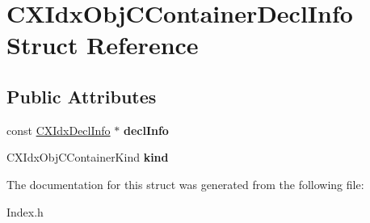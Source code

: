 \hypertarget{structCXIdxObjCContainerDeclInfo}{}\section{C\+X\+Idx\+Obj\+C\+Container\+Decl\+Info Struct Reference}
\label{structCXIdxObjCContainerDeclInfo}
\subsection*{Public Attributes}
\begin{DoxyCompactItemize}
\item 
\mbox{\label{structCXIdxObjCContainerDeclInfo_a39f1c681d756288deadf52798a6551a2}} 
const \mbox{\hyperlink{structCXIdxDeclInfo}{C\+X\+Idx\+Decl\+Info}} $\ast$ {\bfseries decl\+Info}
\item 
\mbox{\label{structCXIdxObjCContainerDeclInfo_ab497c7753b2df0bf8d88dbfd612c6eae}} 
C\+X\+Idx\+Obj\+C\+Container\+Kind {\bfseries kind}
\end{DoxyCompactItemize}


The documentation for this struct was generated from the following file\+:\begin{DoxyCompactItemize}
\item 
Index.\+h\end{DoxyCompactItemize}
